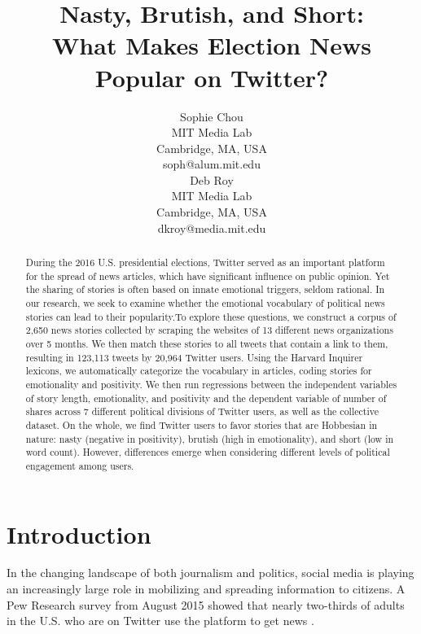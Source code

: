 \documentclass[letterpaper]{article}
\begin{document}
%
\title{Nasty, Brutish, and Short:\\
What Makes Election News Popular on Twitter?}
\author{Sophie Chou\\
MIT Media Lab\\
Cambridge, MA, USA\\
soph@alum.mit.edu\\
\And
Deb Roy\\
MIT Media Lab\\
Cambridge, MA, USA\\
dkroy@media.mit.edu\\
}
\maketitle
\begin{abstract}
During the 2016 U.S. presidential elections, Twitter served as an important platform for the spread of news articles, which have significant influence on public opinion. Yet the sharing of stories is often based on innate emotional triggers, seldom rational. In our research, we seek to examine whether the emotional vocabulary of political news stories can lead to their popularity.To explore these questions, we construct a corpus of 2,650 news stories collected by scraping the websites of 13 different news organizations over 5 months. We then match these stories to all tweets that contain a link to them, resulting in 123,113 tweets by 20,964 Twitter users. Using the Harvard Inquirer lexicons, we automatically categorize the vocabulary in articles, coding stories for emotionality and positivity. We then run regressions between the independent variables of story length, emotionality, and positivity and the dependent variable of number of shares across 7 different political divisions of Twitter users, as well as the collective dataset. On the whole, we find Twitter users to favor stories that are Hobbesian in nature: nasty (negative in positivity), brutish (high in emotionality), and short (low in word count). However, differences emerge when considering different levels of political engagement among users.

\end{abstract}

 
\section{Introduction}
In the changing landscape of both journalism and politics, social media is playing an increasingly large role in mobilizing and spreading information to citizens. A Pew Research survey from August 2015 showed that nearly two-thirds of adults in the U.S. who are on Twitter use the platform to get news \cite{pew-Twitter-news}. 
\end{document}
